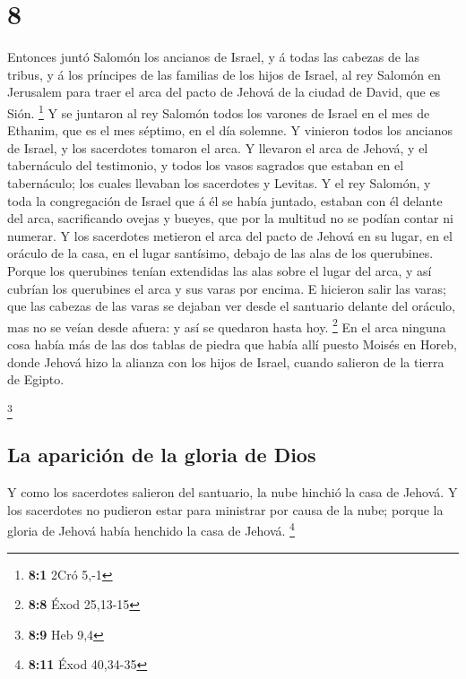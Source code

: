\hypertarget{section-7}{%
\section{8}\label{section-7}}

 Entonces juntó Salomón los ancianos de Israel, y á todas
las cabezas de las tribus, y á los príncipes de las familias de los
hijos de Israel, al rey Salomón en Jerusalem para traer el arca del
pacto de Jehová de la ciudad de David, que es Sión. \footnote{\textbf{8:1}
  2Cró 5,-1}  Y se juntaron al rey Salomón todos los
varones de Israel en el mes de Ethanim, que es el mes séptimo, en el día
solemne.  Y vinieron todos los ancianos de Israel, y los
sacerdotes tomaron el arca.  Y llevaron el arca de Jehová,
y el tabernáculo del testimonio, y todos los vasos sagrados que estaban
en el tabernáculo; los cuales llevaban los sacerdotes y Levitas.
 Y el rey Salomón, y toda la congregación de Israel que á
él se había juntado, estaban con él delante del arca, sacrificando
ovejas y bueyes, que por la multitud no se podían contar ni numerar.
 Y los sacerdotes metieron el arca del pacto de Jehová en
su lugar, en el oráculo de la casa, en el lugar santísimo, debajo de las
alas de los querubines.  Porque los querubines tenían
extendidas las alas sobre el lugar del arca, y así cubrían los
querubines el arca y sus varas por encima.  E hicieron
salir las varas; que las cabezas de las varas se dejaban ver desde el
santuario delante del oráculo, mas no se veían desde afuera: y así se
quedaron hasta hoy. \footnote{\textbf{8:8} Éxod 25,13-15} 
En el arca ninguna cosa había más de las dos tablas de piedra que había
allí puesto Moisés en Horeb, donde Jehová hizo la alianza con los hijos
de Israel, cuando salieron de la tierra de Egipto.

\footnote{\textbf{8:9} Heb 9,4}

\hypertarget{la-apariciuxf3n-de-la-gloria-de-dios}{%
\subsection{La aparición de la gloria de
Dios}\label{la-apariciuxf3n-de-la-gloria-de-dios}}

 Y como los sacerdotes salieron del santuario, la nube
hinchió la casa de Jehová.  Y los sacerdotes no pudieron
estar para ministrar por causa de la nube; porque la gloria de Jehová
había henchido la casa de Jehová. \footnote{\textbf{8:11} Éxod 40,34-35}

